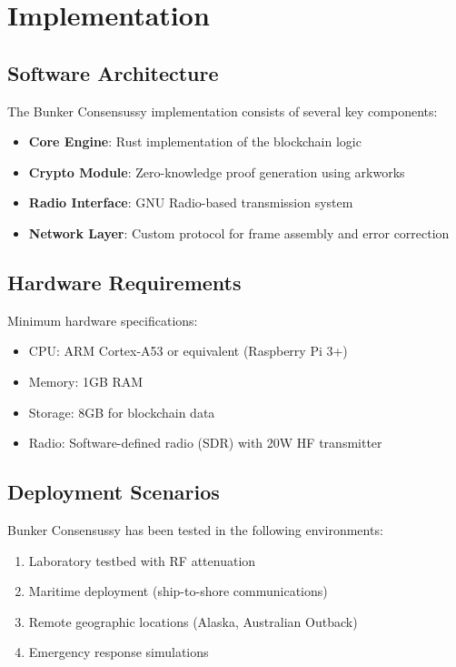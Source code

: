 \documentclass[11pt,a4paper]{article}
\begin{document}
\section{Implementation}

\subsection{Software Architecture}

The Bunker Consensussy implementation consists of several key components:

\begin{itemize}
\item \textbf{Core Engine}: Rust implementation of the blockchain logic
\item \textbf{Crypto Module}: Zero-knowledge proof generation using arkworks
\item \textbf{Radio Interface}: GNU Radio-based transmission system
\item \textbf{Network Layer}: Custom protocol for frame assembly and error correction
\end{itemize}

\subsection{Hardware Requirements}

Minimum hardware specifications:
\begin{itemize}
\item CPU: ARM Cortex-A53 or equivalent (Raspberry Pi 3+)
\item Memory: 1GB RAM
\item Storage: 8GB for blockchain data
\item Radio: Software-defined radio (SDR) with 20W HF transmitter
\end{itemize}

\subsection{Deployment Scenarios}

Bunker Consensussy has been tested in the following environments:
\begin{enumerate}
\item Laboratory testbed with RF attenuation
\item Maritime deployment (ship-to-shore communications)
\item Remote geographic locations (Alaska, Australian Outback)
\item Emergency response simulations
\end{enumerate}
\end{document}
